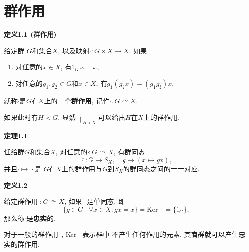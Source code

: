 \documentclass[UTF8]{ctexart}
\begin{document}
\setlength{\abovedisplayskip}{1pt}
\setlength{\belowdisplayskip}{1pt}

\section{群作用}


\hypertarget{sec:定义1.1}{}
\noindent\textbf{定义1.1 (群作用)}

给定\href{../01 群、子群与商群/01 半群与群#nameddest=sec:定义2.1}{群}
$G$和集合$X$, 以及映射$\cdot:G\times X\to X$. 如果
\begin{enumerate}
    \item 对任意的$x\in X$, 有$1_G\,x=x$,
    \item 对任意的$g_1,g_2\in G$和$x\in X$, 有$g_1(g_2x)=(g_1g_2)x$,
\end{enumerate}
就称$\cdot$是$G$在$X$上的一个\textbf{群作用}, 记作$\cdot:G\curvearrowright X$.


\vspace{10pt}

如果此时有$H<G$, 显然$\cdot\!\restriction_{H\times X}$可以给出$H$在$X$上的群作用.

\vspace{10pt}

\hypertarget{sec:定理1.1}{}
\noindent\textbf{定理1.1}

任给群$G$和集合$X$, 对任意的$\cdot:G\curvearrowright X$, 有群同态
\[
    \overline{\cdot}:G\to S_X,\quad g\mapsto(x\mapsto gx),
\]
并且$\cdot\mapsto\overline{\cdot}$是
$G$在$X$上的群作用与$G$到$S_X$的群同态之间的一一对应.

\vspace{10pt}

\hypertarget{sec:定义1.2}{}
\noindent\textbf{定义1.2}

给定群作用$\cdot:G\curvearrowright X$, 如果$\overline{\cdot}$是单同态, 即
\[
    \{g\in G\mid\forall x\in X:gx=x\}=\mathrm{Ker}\,\overline{\cdot}=\{1_G\},
\]
那么称$\cdot$是\textbf{忠实}的.

\vspace{10pt}

对于一般的群作用$\cdot$\,, $\mathrm{Ker}\,\overline{\cdot}$表示群中
不产生任何作用的元素, 其商群就可以产生忠实的群作用.

\vspace{10pt}
\end{document}
